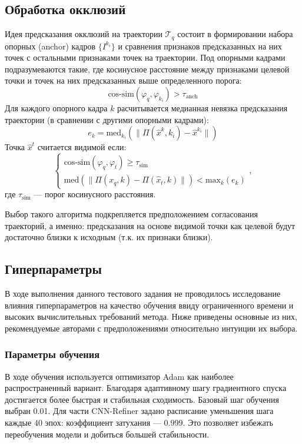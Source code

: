 \documentclass[a4paper, 14pt]{extarticle}
\theoremstyle{definition}
\theoremstyle{plain}
\theoremstyle{remark}
\begin{document}
\subsection{Обработка окклюзий}
Идея предсказания окклюзий на траектории $\mathcal{T}_q$ состоит в формировании набора опорных (anchor) кадров $\{I^{k_i}\}$ и сравнения признаков предсказанных на них точек с остальными признаками точек на траектории. Под опорными кадрами подразумеваются такие, где косинусное расстояние между признаками целевой точки и точек на них предсказанных выше определенного порога:
\begin{equation} \label{eq:anch}
	\text{cos-sim}(\varphi_q,\varphi_{k_i}) > \tau_{\text{anch}}
\end{equation}
Для каждого опорного кадра $k$ расчитывается медианная невязка предсказания траектории (в сравнении с другими опорными кадрами):
\begin{equation}
	e_{k} = \text{med}_{k_i}(\|\Pi(\hat{x}^k,k_i) - \hat{x}^{k_i}\|)
\end{equation}
Точка $\hat{x}^t$ считается видимой если:
\begin{equation} \label{eq:occl}
	\begin{cases}
		\text{cos-sim}(\varphi_q, \varphi_t) \ge \tau_{\text{sim}}\\
		\text{med}(\|\Pi(x_q, k) - \Pi(\hat{x}_t, k)\|) < \text{max}_k(e_k)
	\end{cases},
\end{equation}
где $\tau_{\text{sim}}$ --- порог косинусного расстояния. 

Выбор такого алгоритма подкрепляется предположением согласования траекторий, а именно: предсказания на основе видимой точки как целевой будут достаточно близки к исходным (т.к. их признаки близки).

\subsection{Гиперпараметры}
В ходе выполнения данного тестового задания не проводилось исследование влияния гиперпараметров на качество обучения ввиду ограниченного времени и высоких вычислительных требований метода. Ниже приведены основные из них, рекомендуемые авторами с предположениями относительно интуиции их выбора.
\subsubsection{Параметры обучения}
В ходе обучения используется оптимизатор Adam как наиболее распространенный вариант. Благодаря адаптивному шагу градиентного спуска достигается более быстрая и стабильная сходимость.
Базовый шаг обучения выбран 0.01. Для части CNN-Refiner задано расписание уменьшения шага каждые 40 эпох: коэффициент затухания --- 0.999. Это позволяет избежать переобучения модели и добиться большей стабильности.
\end{document}
